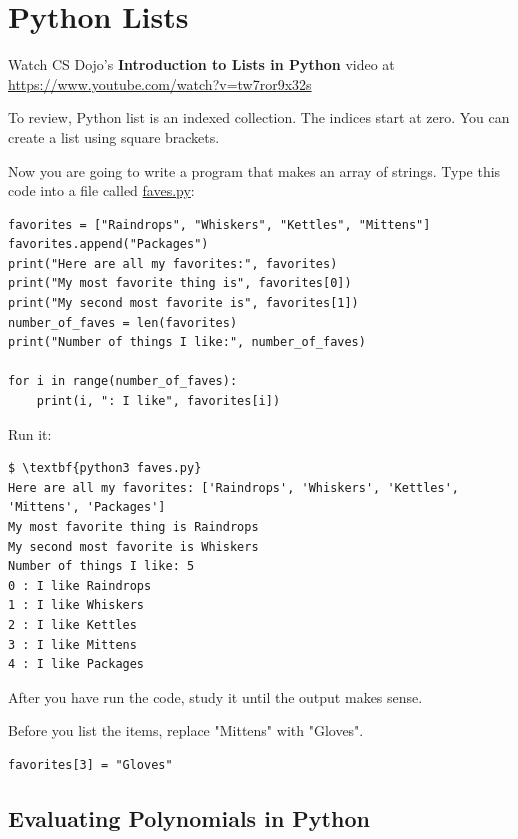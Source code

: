 
\chapter{Python Lists}

Watch CS Dojo's \textbf{Introduction to Lists in Python} video at \url{https://www.youtube.com/watch?v=tw7ror9x32s}

To review, Python list is an indexed collection. The indices start at
zero. You can create a list using square brackets.

Now you are going to write a program that makes an array of
strings. Type this code into a file called \url{faves.py}:

\begin{Verbatim}
favorites = ["Raindrops", "Whiskers", "Kettles", "Mittens"]
favorites.append("Packages")
print("Here are all my favorites:", favorites)
print("My most favorite thing is", favorites[0])
print("My second most favorite is", favorites[1])
number_of_faves = len(favorites)
print("Number of things I like:", number_of_faves)

for i in range(number_of_faves):
    print(i, ": I like", favorites[i])
\end{Verbatim}

Run it:
\begin{Verbatim}[commandchars=\\\{\}]
$ \textbf{python3 faves.py}
Here are all my favorites: ['Raindrops', 'Whiskers', 'Kettles', 'Mittens', 'Packages']
My most favorite thing is Raindrops
My second most favorite is Whiskers
Number of things I like: 5
0 : I like Raindrops
1 : I like Whiskers
2 : I like Kettles
3 : I like Mittens
4 : I like Packages
\end{Verbatim}
After you have run the code, study it until the output makes sense.

\begin{Exercise}[title={Assign into list}, label=assignintolist]
  Before you list the items, replace "Mittens" with "Gloves".
\end{Exercise}
\begin{Answer}[ref=assignintolist]
\begin{Verbatim}
favorites[3] = "Gloves"
\end{Verbatim}
\end{Answer}

\section{Evaluating Polynomials in Python}

